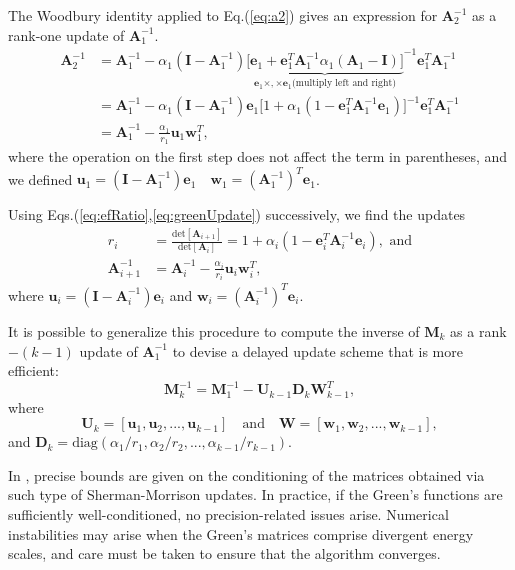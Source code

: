 The Woodbury identity applied to Eq.(\ref{eq:a2}) gives an expression for $\bm A_2^{-1}$ as a rank-one update of $\bm A_1^{-1}$.
\begin{equation}\label{eq:greenUpdate}
\begin{split}
\bm A_2^{-1} &= \bm A_1^{-1} - \alpha_1 ( \bm I - \bm A_1^{-1} ) {\underbrace{\bigg[ \bm e_1 + \bm e_1^T \bm A_1^{-1} \alpha_1 (  \bm A_1 - \bm I ) \bigg]}_{\bm e_1 \times, \times \bm e_1 \text{(multiply left and right)}}}^{-1} \bm e_1^T \bm A_1^{-1} \\
&= \bm A_1^{-1} - \alpha_1 ( \bm I - \bm A_1^{-1} ) \bm e_1 \bigg[ 1 + \alpha_1 ( 1 - \bm e_1^T \bm A_1^{-1} \bm e_1 ) \bigg]^{-1} \bm e_1^T \bm A_1^{-1}  \\
&= \bm A_1^{-1} - \frac{\alpha_1}{r_1} \bm u_1 \bm w_1^T ,
\end{split}
\end{equation}
where the operation on the first step does not affect the term in parentheses, and we defined
$
\bm u_1 = (\bm I - \bm A_1^{-1} ) \bm e_1 \quad \bm w_1 = (\bm A_1^{-1})^T \bm e_1
$.

Using Eqs.(\ref{eq:efRatio},\ref{eq:greenUpdate}) successively, we find the updates
\begin{equation}
\begin{split}
r_i &= \frac{\text{det}[\bm A_{i+1}]}{\text{det}[\bm A_{i}]} = 1 + \alpha_i ( 1 - \bm e_i^T \bm A_i^{-1}  \bm e_i ) , \,\, \text{and} \\
\bm A_{i+1}^{-1} &= \bm A_i^{-1} - \frac{\alpha_i}{r_i} \bm u_i \bm w_i^T ,
\end{split}
\end{equation}
where $\bm u_i = (\bm I - \bm A_i^{-1} ) \bm e_i$ and $\bm w_i = (\bm A_i^{-1})^T \bm e_i$.

It is possible to generalize this procedure to compute the inverse of $\bm M_k$ as a rank$-(k-1)$ update of $\bm A_1^{-1}$ to devise a delayed update scheme that is more efficient:
\begin{equation}
\bm M_k^{-1} = \bm M_1^{-1} - \bm U_{k-1} \bm D_k \bm W_{k-1}^T ,
\end{equation}
where
\begin{equation}
\bm U_k = [ \bm u_1 , \bm u_2, ..., \bm u_{k-1} ] \quad \text{and} \quad \bm W = [ \bm w_1, \bm w_2, ..., \bm w_{k-1} ] ,
\end{equation}
and $\bm D_k = \text{diag}(\alpha_1 / r_1, \alpha_2 / r_2, ..., \alpha_{k-1} / r_{k-1})$.

In \cite{yip_note_1986}, precise bounds are given on the conditioning of the matrices obtained via such type of Sherman-Morrison updates.
In practice, if the Green's functions are sufficiently well-conditioned, no precision-related issues arise.
Numerical instabilities may arise when the Green's matrices comprise divergent energy scales, and care must be taken to ensure that the algorithm converges.

